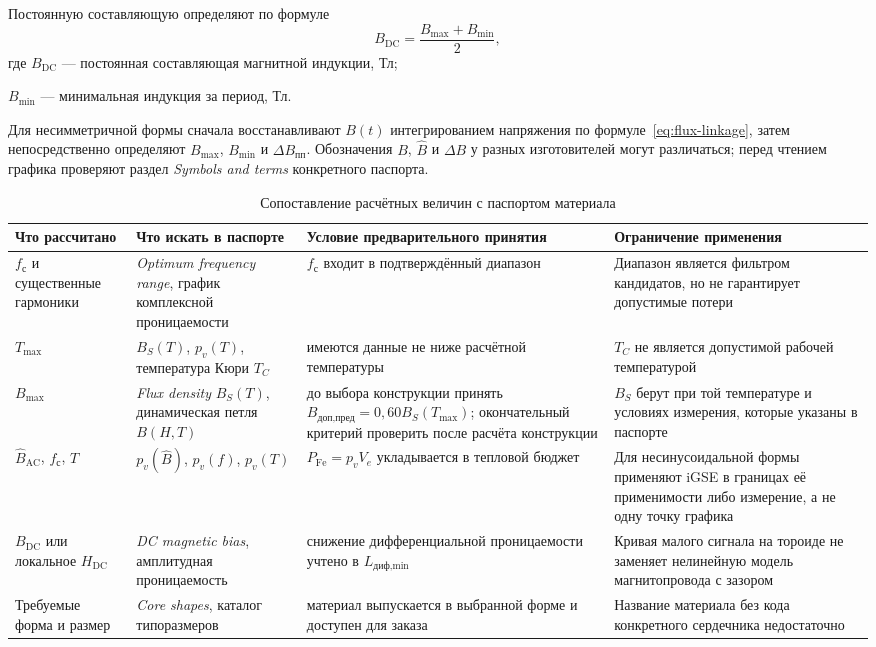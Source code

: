 \documentclass[14pt,a4paper]{extarticle}
\begin{document}
Постоянную составляющую определяют по формуле
\begin{equation}
 B_{\text{DC}}=
 \frac{B_{\max}+B_{\min}}{2},
 \label{eq:bdc}
\end{equation}
где $B_{\text{DC}}$ --- постоянная составляющая магнитной индукции, Тл;\par\noindent
$B_{\min}$ --- минимальная индукция за период, Тл.

Для несимметричной формы сначала восстанавливают $B(t)$ интегрированием
напряжения по формуле~\eqref{eq:flux-linkage}, затем непосредственно
определяют $B_{\max}$, $B_{\min}$ и $\Delta B_{\text{пп}}$. Обозначения
$B$, $\widehat B$ и $\Delta B$ у разных изготовителей могут различаться;
перед чтением графика проверяют раздел \textit{Symbols and terms}
конкретного паспорта.

\begin{table}[H]
\caption{Сопоставление расчётных величин с паспортом материала}
\label{tab:material-datasheet-map}
\centering
\scriptsize
\begin{tabularx}{\textwidth}{>{\raggedright\arraybackslash}p{29mm}
>{\raggedright\arraybackslash}p{38mm}
>{\raggedright\arraybackslash}p{47mm} X}
\toprule
Что рассчитано & Что искать в паспорте & Условие предварительного принятия &
Ограничение применения \\
\midrule
$f_{\text{с}}$ и существенные гармоники &
\textit{Optimum frequency range}, график комплексной проницаемости &
$f_{\text{с}}$ входит в подтверждённый диапазон &
Диапазон является фильтром кандидатов, но не гарантирует допустимые потери \\
$T_{\max}$ &
$B_S(T)$, $p_v(T)$, температура Кюри $T_C$ &
имеются данные не ниже расчётной температуры &
$T_C$ не является допустимой рабочей температурой \\
$B_{\max}$ &
\textit{Flux density} $B_S(T)$, динамическая петля $B(H,T)$ &
до выбора конструкции принять
$B_{\text{доп,пред}}=0{,}60B_S(T_{\max})$; окончательный критерий
проверить после расчёта конструкции &
$B_S$ берут при той температуре и условиях измерения, которые указаны в
паспорте \\
$\widehat B_{\text{AC}}$, $f_{\text{с}}$, $T$ &
$p_v(\widehat B)$, $p_v(f)$, $p_v(T)$ &
$P_{\text{Fe}}=p_vV_e$ укладывается в тепловой бюджет &
Для несинусоидальной формы применяют iGSE в границах её применимости либо
измерение, а не одну точку графика \\
$B_{\text{DC}}$ или локальное $H_{\text{DC}}$ &
\textit{DC magnetic bias}, амплитудная проницаемость &
снижение дифференциальной проницаемости учтено в $L_{\text{диф,min}}$ &
Кривая малого сигнала на тороиде не заменяет нелинейную модель
магнитопровода с зазором \\
Требуемые форма и размер &
\textit{Core shapes}, каталог типоразмеров &
материал выпускается в выбранной форме и доступен для заказа &
Название материала без кода конкретного сердечника недостаточно \\
\bottomrule
\end{tabularx}
\end{table}
\end{document}
